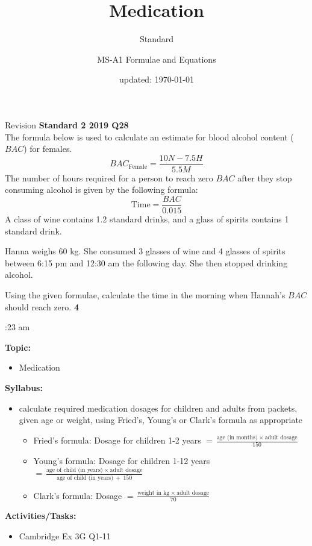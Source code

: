 \documentclass[aspectratio=169,10pt]{beamer}
\title{Medication}
\subtitle{Standard}
\author{MS-A1 Formulae and Equations}
\date{updated: \today
}
\begin{document}
\begin{frame}{Revision}
\small
\textbf{Standard 2 2019 Q28}\\
    The formula below is used to calculate an estimate for blood alcohol content ($BAC$) for females.
    $$BAC_\text{Female}=\frac{10N-7.5H}{5.5M}$$
    The number of hours required for a person to reach zero $BAC$ after they stop consuming alcohol is given by the following formula:
    $$\text{Time}=\frac{BAC}{0.015}$$
    A class of wine contains 1.2 standard drinks, and a glass of spirits contains 1 standard drink.
    
    Hanna weighs 60 kg. She consumed 3 glasses of wine and 4 glasses of spirits between 6:15 pm and 12:30 am the following day. She then stopped drinking alcohol.
    
    Using the given formulae, calculate the time in the morning when Hannah's $BAC$ should reach zero.
    \hfill\textbf{4}\vspace{2em}\pause
  \begin{solution}[]
:23 am
    \end{solution}
\end{frame}

\frame{\titlepage}

\begin{frame}
  \begin{outcome}
    \textbf{Topic:}
    \begin{itemize}
      \item[] Medication
    \end{itemize}

    \textbf{Syllabus:}
    \begin{itemize}
      \item calculate required medication dosages for children and adults from packets, given age or weight, using Fried’s, Young’s or Clark’s formula as appropriate
      \begin{itemize}
          \item Fried's formula: Dosage for children 1-2 years $=\frac{\text{age (in months)}\ \times\ \text{adult dosage}}{150}$
          \item Young's formula: Dosage for children 1-12 years $=\frac{\text{age of child (in years)}\ \times\ \text{adult dosage}}{\text{age of child (in years)}\ +\ 150}$
          \item Clark's formula: Dosage $=\frac{\text{weight in kg}\ \times\ \text{adult dosage}}{70}$
      \end{itemize}
    \end{itemize}

    \textbf{Activities/Tasks:}
    \begin{itemize}
      \item Cambridge Ex 3G Q1-11
    \end{itemize}
  \end{outcome}
\end{frame}
\end{document}
